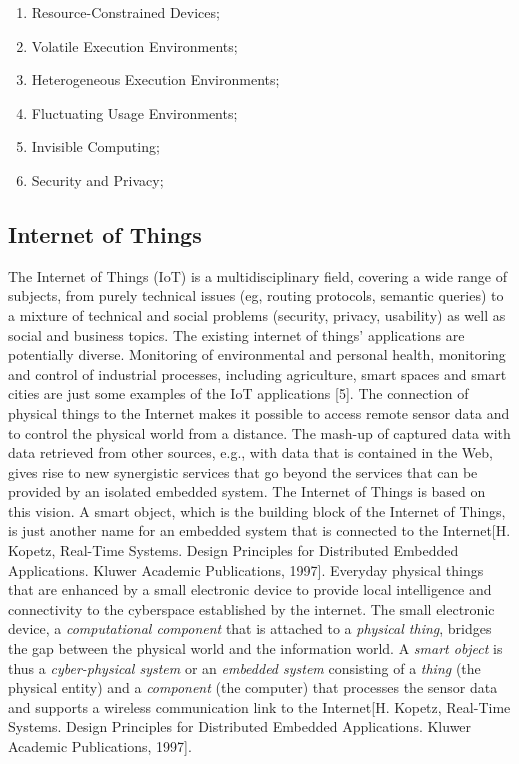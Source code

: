 \documentclass{acm_proc_article-sp}
\begin{document}
\begin{enumerate}
\item Resource-Constrained Devices; 	
\item Volatile Execution Environments; 	
\item Heterogeneous Execution Environments;
\item Fluctuating Usage Environments;
\item Invisible Computing;
\item Security and Privacy;
\end{enumerate}

\subsection{Internet of Things}
The Internet of Things (IoT) is a multidisciplinary field, covering a wide range of subjects, from purely technical issues (eg, routing protocols, semantic queries) to a mixture of technical and social problems (security, privacy, usability) as well as social and business topics. The existing internet of things’ applications are potentially diverse. Monitoring of environmental and personal health, monitoring and control of industrial processes, including agriculture, smart spaces and smart cities are just some examples of the IoT applications [5].
\newline
\newline
The connection of physical things to the Internet makes it possible to access remote sensor data and to control the physical world from a distance. The mash-up of captured data with data retrieved from other sources, e.g., with data that is contained in the Web, gives rise to new synergistic services that go beyond the services that can be provided by an isolated embedded system. The Internet of Things is based on this vision. A smart object, which is the building block of the Internet of Things, is just another name for an embedded system that is connected to the Internet[H. Kopetz, Real-Time Systems. Design Principles for Distributed Embedded
Applications. Kluwer Academic Publications, 1997].
\newline
\newline
Everyday physical things that are enhanced by a small electronic device to provide local intelligence and connectivity to the cyberspace established by the internet. The small electronic device, a \textit{computational component} that is attached to a \textit{physical thing}, bridges the gap between the physical world and the information world. A \textit{smart object} is thus a \textit{cyber-physical system} or an \textit{embedded system} consisting of a \textit{thing} (the physical entity) and a \textit{component} (the computer) that processes the sensor data and supports a wireless communication link to the Internet[H. Kopetz, Real-Time Systems. Design Principles for Distributed Embedded
Applications. Kluwer Academic Publications, 1997].
\end{document}
